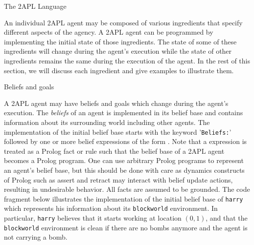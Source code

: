 \begin{chapter}{The 2APL Language}



An individual 2APL agent may be composed of various ingredients that
specify different aspects of the agency. A 2APL agent can be
programmed by implementing the initial state of those ingredients.
The state of some of these ingredients will change during the
agent's execution while the state of other ingredients remains the
same during the execution of the agent. In the rest of this section,
we will discuss each ingredient and give examples to illustrate
them.

\begin{section}{Beliefs and goals}

A 2APL agent may have beliefs and goals which change during the
agent's execution. The \emph{beliefs} of an agent is implemented in
its belief base and contains information about its surrounding world
including other agents. The implementation of the initial belief
base starts with the keyword '{\tt Beliefs:}' followed by one or
more belief expressions of the form . Note that a
 expression is treated as a Prolog fact or rule such
that the belief base of a 2APL agent becomes a Prolog program. One
can use arbitrary Prolog programs to represent an agent's belief
base, but this should be done with care as dynamics constructs of
Prolog such as assert and retract may interact with belief update
actions, resulting in undesirable behavior. All facts are assumed to
be grounded. The code fragment below illustrates the implementation
of the initial belief base of {\tt harry} which represents his
information about its {\tt blockworld} environment. In particular,
{\tt harry} believes that it starts working at location $(0,1)$, and
that the {\tt blockworld} environment is clean if there are no bombs
anymore and the agent is not carrying a bomb.


\end{section}
\end{chapter}
